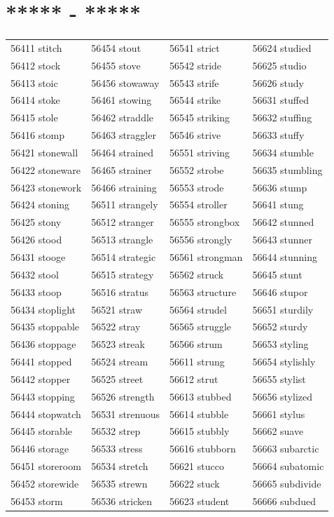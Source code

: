 \documentclass[10pt, oneside]{book}
\begin{document}
\begin{table}[h]
	\centering
	\section*{***** - *****}
	\begin{tabular}{l l l l}
56411 stitch &56454 stout &56541 strict &56624 studied\\
56412 stock &56455 stove &56542 stride &56625 studio\\
56413 stoic &56456 stowaway &56543 strife &56626 study\\
56414 stoke &56461 stowing &56544 strike &56631 stuffed\\
56415 stole &56462 straddle &56545 striking &56632 stuffing\\
56416 stomp &56463 straggler &56546 strive &56633 stuffy\\
56421 stonewall &56464 strained &56551 striving &56634 stumble\\
56422 stoneware &56465 strainer &56552 strobe &56635 stumbling\\
56423 stonework &56466 straining &56553 strode &56636 stump\\
56424 stoning &56511 strangely &56554 stroller &56641 stung\\
56425 stony &56512 stranger &56555 strongbox &56642 stunned\\
56426 stood &56513 strangle &56556 strongly &56643 stunner\\
56431 stooge &56514 strategic &56561 strongman &56644 stunning\\
56432 stool &56515 strategy &56562 struck &56645 stunt\\
56433 stoop &56516 stratus &56563 structure &56646 stupor\\
56434 stoplight &56521 straw &56564 strudel &56651 sturdily\\
56435 stoppable &56522 stray &56565 struggle &56652 sturdy\\
56436 stoppage &56523 streak &56566 strum &56653 styling\\
56441 stopped &56524 stream &56611 strung &56654 stylishly\\
56442 stopper &56525 street &56612 strut &56655 stylist\\
56443 stopping &56526 strength &56613 stubbed &56656 stylized\\
56444 stopwatch &56531 strenuous &56614 stubble &56661 stylus\\
56445 storable &56532 strep &56615 stubbly &56662 suave\\
56446 storage &56533 stress &56616 stubborn &56663 subarctic\\
56451 storeroom &56534 stretch &56621 stucco &56664 subatomic\\
56452 storewide &56535 strewn &56622 stuck &56665 subdivide\\
56453 storm &56536 stricken &56623 student &56666 subdued\\
	\end{tabular}
 \end{table}
\end{document}
